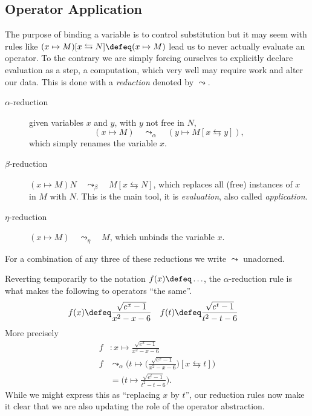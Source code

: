 \subsection{Operator Application}
The purpose of binding a variable is to control substitution but it may seem 
with rules like $(x\mapsto M)[x\leftrightarrows N]\defeq (x\mapsto M)$ lead 
us to never actually evaluate an operator.  To the contrary we are simply forcing 
ourselves to explicitly declare evaluation as a step, a computation, which 
very well may require work and alter our data.  This is done with a \emph{reduction}
denoted by $\leadsto$.
\begin{description}
    \item[$\alpha$-reduction] given variables $x$ and $y$, with $y$ not free in $N$,
    \[(x\mapsto M)\quad \leadsto_{\alpha}\quad (y\mapsto M[x\leftrightarrows y]),\]
    which simply renames the variable $x$.

    \item[$\beta$-reduction]
    $(x\mapsto M)N \quad \leadsto_{\beta} \quad M[x\leftrightarrows N]$, which replaces all (free)
    instances of $x$ in $M$ with $N$.  This is the main tool, it is \emph{evaluation},
    also called \emph{application}.
    
    \item[$\eta$-reduction]
    $(x\mapsto M)\quad \leadsto_{\eta} \quad M$, which unbinds the variable $x$.
\end{description}
For a combination of any three of these reductions we write $\leadsto$ unadorned.

Reverting temporarily to the notation $f(x)\defeq \ldots$, the $\alpha$-reduction rule
is what makes the following to operators ``the same''.
\begin{align*}
    f(x) &\defeq  \frac{\sqrt{e^x-1}}{x^2-x-6}
    & 
    f(t) &\defeq  \frac{\sqrt{e^t-1}}{t^2-t-6}
\end{align*}
More precisely
\begin{align*}
    f&:x\mapsto \frac{\sqrt{e^x-1}}{x^2-x-6}\\
    f & \leadsto_{\alpha} \biggl(t\mapsto \biggl(\frac{\sqrt{e^x-1}}{x^2-x-6}\biggr)[x\leftrightarrows t]\biggr)\\
      &  = \biggl(t\mapsto\frac{\sqrt{e^t-1}}{t^2-t-6}\biggr).
\end{align*}
While we might express this as ``replacing $x$ by $t$'', our reduction rules
now make it clear that we are also updating the role of the operator abstraction.


